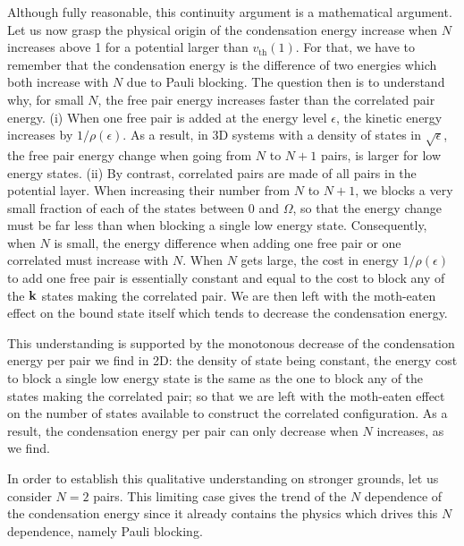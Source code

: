 \documentclass[3p,twocolumn]{elsarticle}
\begin{document}
Although fully reasonable, this continuity argument is a mathematical argument. Let us now grasp the physical origin of the condensation energy increase when $N$ increases above 1 for a potential larger than $v_{\text{th}}(1)$.  For that, we have to remember that the condensation energy is the difference of two energies which both increase with $N$ due to Pauli blocking.  The question then is to understand why, for small $N$, the free pair energy increases faster than the correlated pair energy.  (i) When one free pair is added at the energy level $\epsilon$, the kinetic energy increases by $1/\rho(\epsilon)$.  As a result, in 3D systems with a density of states in $\sqrt{\epsilon}$, the free pair energy change when going from $N$ to $N+1$ pairs, is  larger for low energy states.  (ii) By contrast, correlated pairs are made of all pairs in the potential layer. When increasing their number from $N$ to $N+1$, we blocks a very small fraction of each of the states between $0$ and $\Omega$, so that the energy change must be far less than when blocking a single low energy state.  Consequently, when $N$ is small,  the energy difference when adding one free pair or one correlated must increase with $N$. When $N$ gets large, the cost in energy $1/\rho(\epsilon)$ to add one free pair is essentially constant and equal to the cost to block any of the $\mathbf{k}$ states making the correlated pair.  We are then left with the moth-eaten effect on the bound state itself which tends to decrease the condensation energy. 

This understanding is supported by the monotonous decrease of the condensation energy per pair we find in 2D: the density of state being constant, the energy cost to block a single low energy state is the same as the one to block  any of the states making the correlated pair; so that we are left with the moth-eaten effect on the number of states available to construct the correlated configuration.  As a result, the condensation energy per pair can only decrease when $N$ increases, as we find.  

In order to establish this qualitative understanding on stronger  grounds, let us consider $N=2$ pairs. This limiting case gives the trend of the $N$ dependence of the condensation energy since it already contains the physics which drives this $N$ dependence, namely Pauli blocking.  
\end{document}
